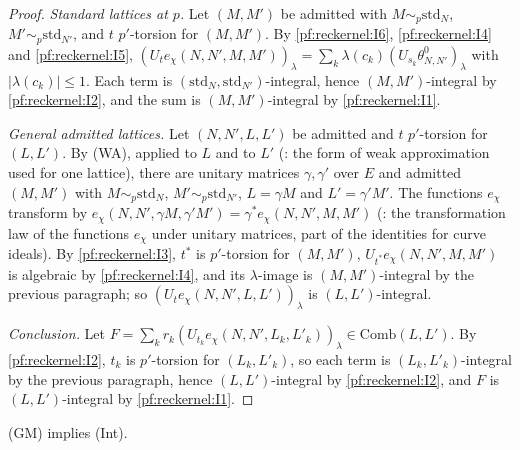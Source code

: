 \begin{proof}
\emph{Standard lattices at $p$.} Let $(M,M')$ be admitted with $M\sim_p\mathrm{std}_N$, $M'\sim_p\mathrm{std}_{N'}$, and $t$
$p'$-torsion for $(M,M')$. By \ref{pf:reckernel:I6}, \ref{pf:reckernel:I4} and \ref{pf:reckernel:I5},
$(U_te_\chi(N,N',M,M'))_\lambda=\sum_k\lambda(c_k)(U_{s_k}\theta^0_{N,N'})_\lambda$ with $|\lambda(c_k)|\le1$. Each term is
$(\mathrm{std}_N,\mathrm{std}_{N'})$-integral, hence $(M,M')$-integral by \ref{pf:reckernel:I2}, and the sum is $(M,M')$-integral
by \ref{pf:reckernel:I1}.

\emph{General admitted lattices.} Let $(N,N',L,L')$ be admitted and $t$ $p'$-torsion for $(L,L')$. By \textup{(WA)}, applied
to $L$ and to $L'$ (: the form of weak approximation used for one lattice),
there are unitary matrices $\gamma,\gamma'$ over $E$ and admitted $(M,M')$ with $M\sim_p\mathrm{std}_N$,
$M'\sim_p\mathrm{std}_{N'}$, $L=\gamma M$ and $L'=\gamma'M'$. The functions $e_\chi$ transform by
$e_\chi(N,N',\gamma M,\gamma'M')=\gamma^*e_\chi(N,N',M,M')$
(: the transformation law of the
functions $e_\chi$ under unitary matrices, part of the identities for curve ideals). By \ref{pf:reckernel:I3}, $t^*$ is
$p'$-torsion for $(M,M')$, $U_{t^*}e_\chi(N,N',M,M')$ is algebraic by \ref{pf:reckernel:I4}, and its $\lambda$-image is
$(M,M')$-integral by the previous paragraph; so $(U_te_\chi(N,N',L,L'))_\lambda$ is $(L,L')$-integral.

\emph{Conclusion.} Let $F=\sum_kr_k(U_{t_k}e_\chi(N,N',L_k,L'_k))_\lambda\in\mathrm{Comb}(L,L')$. By \ref{pf:reckernel:I2},
$t_k$ is $p'$-torsion for $(L_k,L'_k)$, so each term is $(L_k,L'_k)$-integral by the previous paragraph, hence
$(L,L')$-integral by \ref{pf:reckernel:I2}, and $F$ is $(L,L')$-integral by \ref{pf:reckernel:I1}.
\end{proof}

\begin{theorem}\label{pf:reckernel:intInert}
\textup{(GM)} implies \textup{(Int)}.
\end{theorem}

